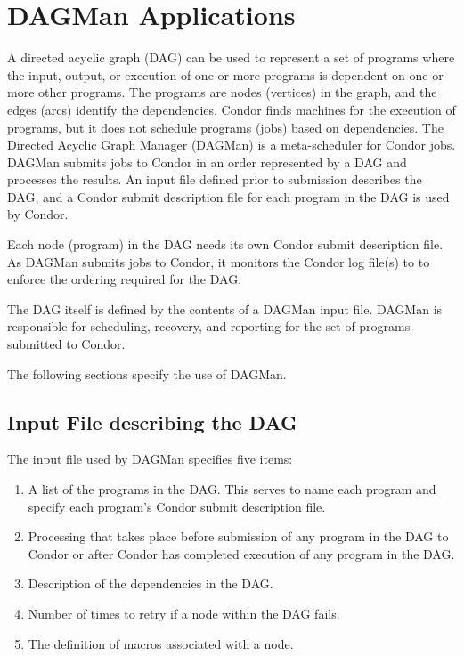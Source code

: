 \section{\label{sec:DAGMan}DAGMan Applications}

A directed acyclic graph (DAG) can be used to represent a set of programs
where the input, output, or execution of one or more programs
is dependent on one or more other programs.
The programs are nodes (vertices) in the graph,
and the edges (arcs) identify the dependencies.
Condor finds machines for the execution of programs, but it
does not schedule programs (jobs) based on dependencies.
The Directed Acyclic Graph Manager (DAGMan) is a meta-scheduler for Condor
jobs. 
DAGMan submits jobs to Condor in an order represented by
a DAG and processes the results.
An input file defined prior to submission describes the DAG, and
a Condor submit description file for each program in the DAG
is used by Condor.

Each node (program) in the DAG needs its own Condor submit description file.
As DAGMan submits jobs to Condor, it monitors the Condor log file(s) to 
to enforce the ordering required for the DAG.

The DAG itself is defined by the contents of a DAGMan input file.
DAGMan is responsible for scheduling, recovery, and reporting
for the set of programs submitted to Condor.

The following sections specify the use of DAGMan.

\subsection{Input File describing the DAG}

The input file used by DAGMan specifies five items:
\begin{enumerate}
\item
A list of the programs in the DAG. This serves to name each program
and specify each program's Condor submit description file.
\item
Processing that takes place before submission of
any program in the DAG to Condor or after Condor has completed execution
of any program in the DAG.
\item
Description of the dependencies in the DAG.
\item
Number of times to retry if a node within the DAG fails.
\item
The definition of macros associated with a node.
\end{enumerate}


